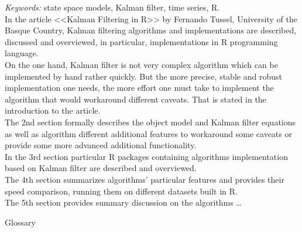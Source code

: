 \documentclass[a4paper,14pt]{extarticle}
\begin{document}
\textit{Keywords:} state space models, Kalman filter, time series, R. \\

In the article <<Kalman Filtering in R>> by Fernando Tussel, University of the
Basque Country, Kalman filtering algorithms and implementations are described,
discussed and overviewed, in particular, implementations in R programming
language. \\

On the one hand, Kalman filter is not very complex algorithm which can be
implemented by hand rather quickly. But the more precise, stable and robust
implementation one needs, the more effort one must take to implement the
algorithm that would workaround different caveats. That is stated in the
introduction to the article. \\

The 2nd section formally describes the object model and Kalman filter
equations as well as algorithm different additional features to workaround
some caveats or provide some more advanced additional functionality. \\

In the 3rd section particular R packages containing
algorithms implementation based on Kalman filter are
described and overviewed. \\

The 4th section summarizes algorithms' particular features and provides their speed
comparison, running them on different datasets built in R. \\

The 5th section provides summary discussion on the algorithms \ldots \\

\newpage

\begin{center}
	Glossary
\end{center}
\end{document}
